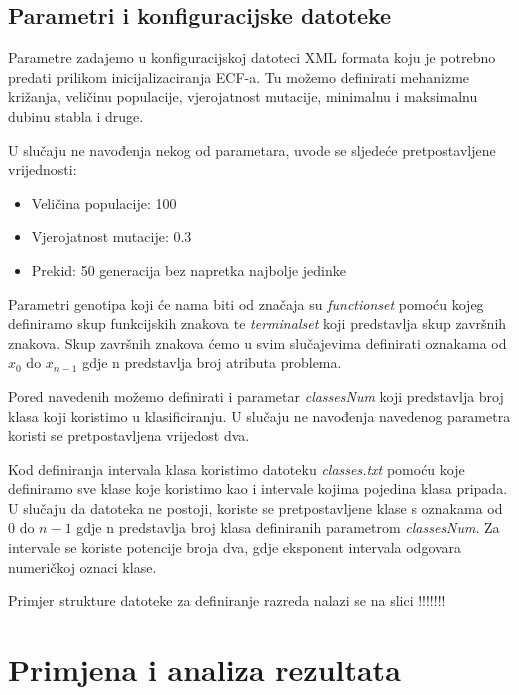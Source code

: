 \documentclass[times, utf8, zavrsni]{fer}
\begin{document}
\section{Parametri i konfiguracijske datoteke}

Parametre zadajemo u konfiguracijskoj datoteci XML formata koju je potrebno predati prilikom inicijalizaciranja ECF-a. Tu možemo definirati mehanizme križanja, veličinu populacije, vjerojatnost mutacije, minimalnu i maksimalnu dubinu stabla i druge. 

U slučaju ne navođenja nekog od  parametara, uvode se sljedeće pretpostavljene vrijednosti: 

\begin{itemize}
\item Veličina populacije: 100
\item Vjerojatnost mutacije: 0.3
\item Prekid: 50 generacija bez napretka najbolje jedinke
\end{itemize}

Parametri genotipa koji će nama biti od značaja su \textit{functionset} pomoću kojeg definiramo skup funkcijskih znakova te \textit{terminalset} koji predstavlja skup završnih znakova. Skup završnih znakova ćemo u svim slučajevima definirati oznakama od $x_0$ do $x_{n-1}$ gdje n predstavlja broj atributa problema.

Pored navedenih možemo definirati i parametar \textit{classesNum} koji predstavlja broj klasa koji koristimo u klasificiranju. U slučaju ne navođenja navedenog parametra koristi se pretpostavljena vrijedost dva.

Kod definiranja intervala klasa koristimo datoteku \textit{classes.txt} pomoću koje definiramo sve klase koje koristimo kao i intervale kojima pojedina klasa pripada. U slučaju da datoteka ne postoji, koriste se pretpostavljene klase s oznakama od $0$ do $n-1$ gdje n predstavlja broj klasa definiranih parametrom \textit{classesNum}. Za intervale se koriste potencije broja dva, gdje eksponent intervala odgovara numeričkoj oznaci klase.

Primjer strukture datoteke za definiranje razreda nalazi se na slici !!!!!!!






 




\chapter{Primjena i analiza rezultata}
\end{document}

